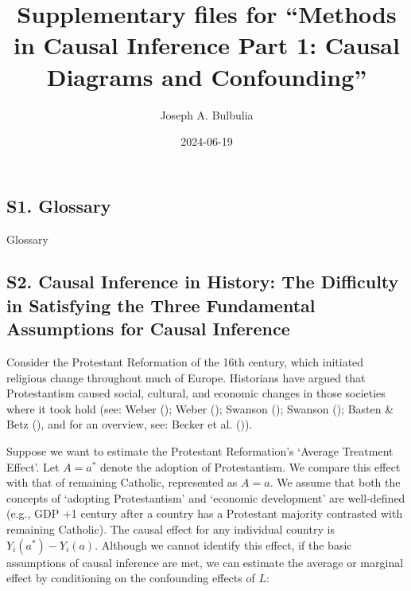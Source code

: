 \documentclass[
  single column]{article}
\title{Supplementary files for ``Methods in Causal Inference Part 1:
Causal Diagrams and Confounding''}
\author{Joseph A. Bulbulia}
\affil{%
             \small{     Victoria University of Wellington, New Zealand
          ORCID \textcolor[HTML]{A6CE39}{\aiOrcid} ~0000-0002-5861-2056 }
              }
\date{2024-06-19}
\renewcommand*\contentsname{Table of contents}
\newcommand\contentsname{Table of contents}
\begin{document}
\maketitle

\renewcommand*\contentsname{Table of contents}
{
\hypersetup{linkcolor=}
\setcounter{tocdepth}{2}
\tableofcontents
}
\listoftables
\newpage{}

\subsection{S1. Glossary}\label{id-app-a}

\begin{table}

\caption{\label{tbl-experiments}Glossary}

\centering{

\glossaryTerms

}

\end{table}%

\newpage{}

\subsection{S2. Causal Inference in History: The Difficulty in
Satisfying the Three Fundamental Assumptions for Causal
Inference}\label{id-app-b}

Consider the Protestant Reformation of the 16th century, which initiated
religious change throughout much of Europe. Historians have argued that
Protestantism caused social, cultural, and economic changes in those
societies where it took hold (see: Weber
(); Weber
(); Swanson
(); Swanson
(); Basten \& Betz
(), and for an overview, see: Becker et
al. ()).

Suppose we want to estimate the Protestant Reformation's `Average
Treatment Effect'. Let \(A = a^*\) denote the adoption of Protestantism.
We compare this effect with that of remaining Catholic, represented as
\(A = a\). We assume that both the concepts of `adopting Protestantism'
and `economic development' are well-defined (e.g., GDP +1 century after
a country has a Protestant majority contrasted with remaining Catholic).
The causal effect for any individual country is \(Y_i(a^*) - Y_i(a)\).
Although we cannot identify this effect, if the basic assumptions of
causal inference are met, we can estimate the average or marginal effect
by conditioning on the confounding effects of \(L\):
\end{document}
